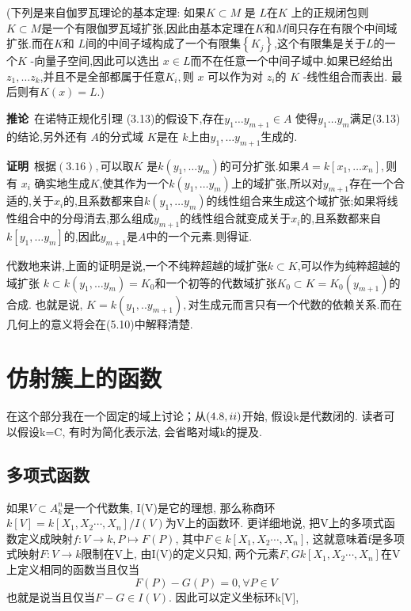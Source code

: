 \documentclass[UTF8]{book}
\begin{document}
		
		(下列是来自伽罗瓦理论的基本定理: 如果$K \subset M$ 是 $L$在$K$ 上的正规闭包则 $K \subset M$是一个有限伽罗瓦域扩张,因此由基本定理在$K$和$M$间只存在有限个中间域扩张.而在$K$和 $L$间的中间子域构成了一个有限集$\left\{ K _{ j }\right\}$,这个有限集是关于$ L $的一个$K$ -向量子空间,因此可以选出 $x \in L$而不在任意一个中间子域中.如果已经给出$z_{1}, \ldots z_{k}$,并且不是全部都属于任意$K _{ i },$则 $x$ 可以作为对 $z _{ i } $的 $K$ -线性组合而表出. 最后则有$K (x )= L$.)
		
		
		\textbf{推论}\  在诺特正规化引理 (3.13)的假设下,存在$y_{1} \ldots y_{m+1} \in A$ 使得$y_{1} \ldots y_{m}$满足(3.13)的结论,另外还有 $A$的分式域 $K$是在 $k$上由$y _{1}, \ldots y _{ m +1}$生成的.
		
		
		\textbf{证明}\ 根据$(3.16),$可以取$K$ 是$k \left(y _{1}, \ldots y _{ m }\right) $的可分扩张.如果$A = k \left[ x _{1}, \ldots x _{ n }\right],$则有 $x _{ i }$ 确实地生成$K$,使其作为一个$k \left(y _{1}, \ldots y _{ m }\right)$上的域扩张,所以对$y _{ m +1}$存在一个合适的,关于$x _{i}$的,且系数都来自$k \left(y _{1}, \ldots y _{ m }\right) $的线性组合来生成这个域扩张;如果将线性组合中的分母消去,那么组成$y _{ m +1}$的线性组合就变成关于$x _{i}$的,且系数都来自$k [  y _{1}, \ldots y _{ m } ] $的,因此$y _{ m +1}$是$ A $中的一个元素.则得证.
		
		
		代数地来讲,上面的证明是说,一个不纯粹超越的域扩张$k \subset K $,可以作为纯粹超越的域扩张 $k \subset k \left(y _{1}, \ldots y _{ m }\right)= K _{0}$和一个初等的代数域扩张$K _{0} \subset K = K _{0}\left(y _{ m +1}\right) $的合成. 也就是说, $K = k \left(y _{1}, . . y _{ m +1}\right),$对生成元而言只有一个代数的依赖关系.而在几何上的意义将会在(5.10)中解释清楚.

\chapter{仿射簇上的函数}
\indent 在这个部分我在一个固定的域上讨论；从$(4.8, \romannumeral2)$开始, 假设k是代数闭的. 读者可以假设k=C, 有时为简化表示法, 会省略对域k的提及.

\section{多项式函数} 如果$V\subset A^{n}_{k}$是一个代数集, I(V)是它的理想, 那么称商环$k[V]=k[X_{1},X_{2}\cdots,X_{n}]/I(V)$为V上的函数环. 更详细地说, 把V上的多项式函数定义成映射$f:V\rightarrow k, P\mapsto F(P)$, 其中$F\in k[X_{1},X_{2}\cdots,X_{n}]$, 这就意味着f是多项式映射$F:V\rightarrow k$限制在V上, 由I(V)的定义只知, 两个元素$F,G k[X_{1},X_{2}\cdots,X_{n}]$在V上定义相同的函数当且仅当
\begin{equation*}
F(P)-G(P)=0, \forall  P\in V
\end{equation*}
也就是说当且仅当$F-G\in I(V)$. 因此可以定义坐标环k[V],
\end{document}
